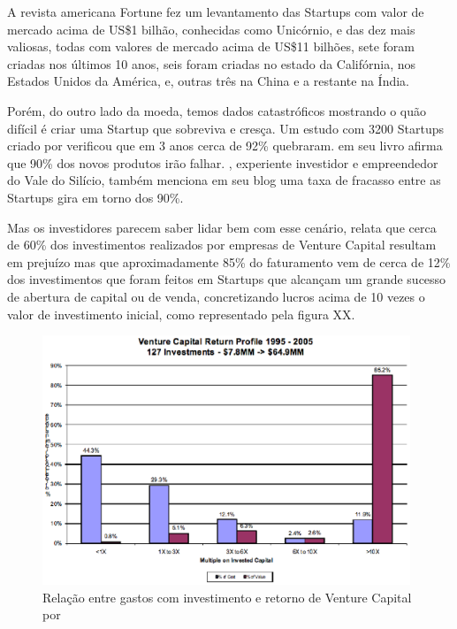 A revista americana Fortune fez um levantamento das Startups com valor de mercado acima de US\$1 bilhão, conhecidas como Unicórnio, e das dez mais valiosas, todas com valores de mercado acima de US\$11 bilhões, sete foram criadas nos últimos 10 anos, seis foram criadas no estado da Califórnia, nos Estados Unidos da América, e, outras três na China e a restante na Índia.

Porém, do outro lado da moeda, temos dados catastróficos mostrando o quão difícil é criar uma Startup que sobreviva e cresça. Um estudo com 3200 Startups criado por  verificou que em 3 anos cerca de 92\% quebraram.  em seu livro afirma que 90\% dos novos produtos irão falhar. , experiente investidor e empreendedor do Vale do Silício, também menciona em seu blog uma taxa de fracasso entre as Startups gira em torno dos 90\%. 

Mas os investidores parecem saber lidar bem com esse cenário,  relata que cerca de 60\% dos investimentos realizados por empresas de Venture Capital resultam em prejuízo mas que aproximadamente 85\% do faturamento vem de cerca de 12\% dos investimentos que foram feitos em Startups que alcançam um grande sucesso de abertura de capital ou de venda, concretizando lucros acima de 10 vezes o valor de investimento inicial, como representado pela figura XX. 

\begin{figure}[!htb]
\centering
\includegraphics[width=11cm,angle=0]{figuras/venture_capital_profits}
\caption{Relação entre gastos com investimento e retorno de Venture Capital por \cite{Sahlman2010}}
\label{Rotulo}
\end{figure}

